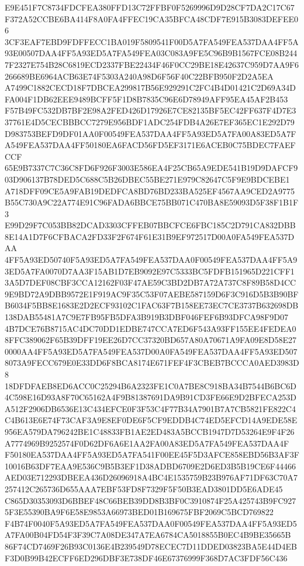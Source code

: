 \documentclass[UTF8,fontset=fandol,zihao=-4,a4paper]{ctexart}
\begin{document}
{{E9E451F7C8734FDCFEA380FFD13C72FFBF0F5269996D9D28CF7DA2C17C67F372A52CCBE6BA414F8A0FA4FFEC19CA35BFCA48CDF7E915B3083DEFEE06
3CF3EAF7EBD9FDFFECC1BA019F5809541F00D5A7FA549FEA537DAA4FF5A93E00507DAA4FF5A93ED5A7FA549FEA03C083A9FE5C96B9B1567FCE08B244
7F2327E754B28C6819ECD2337FBE22434F46F0CC29BE18E42637C959D7AA9F6266689BE6964ACB63E74F5303A240A98D6F56F40C22BFB950F2D2A5EA
A7499C1882CECD18F7DBCEA299817B56E929291C2FC4B4D01421C2D69A34DFA004F1DB62EEE9489BCFF5F1D8B7835C96E6D78949AFF95EA45AF2B453
F57B49FC532DB7BF2E98A2FED426D17926E7CE82135BF5EC42FF637F4D7E337761E4D5CECBBBCC7279E956BDF1ADC254FDB4A26E7EF365EC1E292D79
D983753BEFD9DF01AA0F00549FEA537DAA4FF5A93ED5A7FA00A83ED5A7FA549FEA537DAA4FF50180EA6FACD56FD5EF3171E6ACEB0C75BDEC7FAEFCCF
65E9B7337C7C36C8FD6F926F3003E586EA4F25CB65A9EDE541B19D9DAFCF903D906137B78DED5C688C5B26DBEC55BE271E979C82647C5F9E9BDCEBE1
A718DFF09CE5A9FAB19DEDFCA8BD76BD233BA525EF4567AA9CED2A9775B55C730A9C22A774E91C96FADA6BBCE75BB071C470BA8E59093D5F38F1B1F3
E99D29F7C053BB82DCAD3303CFFEB07BBCFCE6FBC185C2D791CA832DBB8E14A1D7F6CFBACA2FD33F2F674F61E31B9EF972517D00A0FA549FEA537DAA
4FF5A93ED50740F5A93ED5A7FA549FEA537DAA0F00549FEA537DAA4FF5A93ED5A7FA0070D7AA3F15AB1D7EB9092E97C5333BC5FDFB151965D221CFF1
3A5D7DEF08CBF3CCA12162F03F47AE59C3BD2DB7A72A737C8F89B58D4CC9E9BD72A9DBB9572E1F919AC9F35C53F07AEBE587159D6F3C916D5B3B90BF
B6034F5BB8E1683E2D2ECF93102C1FAC63F7B158EE73EC7CE3737B632698DB138DAB55481A7C9E7FB95FB5DFA3B919B3DBF046FEF6B93DFCA98F9D07
4B7DCE76B8715AC4DC70DD1EDBE747CCA7ED6F543A93FF155EE4FEDEA08FFC389062F65B39DFF19EE26D7CC37320BD657A80A70671A9FA09E8D58E27
0000AA4FF5A93ED5A7FA549FEA537D00A0FA549FEA537DAA4FF5A93ED5078073A9FECC679E0E33DD6F8BCA8174E671FEF4F3CBEB7BCCCA0AED3983D8
18DFDFAEB8ED6ACC0C25294B6A2323FE1C0A7BE8C918BA34B7544B6BC6D4C598E16D93A8F70C65162A4F9B81387691DA9B91CD3FE66E9D2BFECA253D
A512F2906DB6536E13C434EFCE0F3F53C4F77B34A7901B7A7CB5821FE822C4C4B613E6E74F73CAF3A9E8EF0DE6F5CF9EDDB4C74ED5EFCD14A9EDE58E
956EA579DA796242BE1C48833FB1AE2ED483A5BCCB1947D7D53264E9F4F26A7774969B9252574F0D62DF6A6E1AA2FA00A83ED5A7FA549FEA537DAA4F
F50180EA537DAA4FF5A93ED5A7FA541F00EE45F5D3AFCE858EBD56B3AF3F10016B63DF7EAA9E536C9B5B3EF1D38ADBD6709E2D6ED3B5B19CE6F44466
AED03E712293DBEEA436D26096918A4BC4E1535759B23B976AF71DF63C70A7257412C265736D655AAA7EBF53FD8F7329F5F50B3EAD3801DD5E6ADE45
C865D30353093D6BBEF48C66BEB39DD8B3BF0C3910874F25A425743B9FC9275F3E55390BA9F6E58E9853A66973BED01B169675FBF2069C5BCD769822
F4B74F0040F5A93ED5A7FA549FEA537DAA0F00549FEA537DAA4FF5A93ED5A7FA00B04FD54F3F39C7A08DE347A7EA6784CA5018855B0EC4B9BE35665B
86F74CD7469F26B93C0136E4B239549D78ECEC7D11DDED03823BA5E44D4EBF3D0B99B42ECFF6ED296DBF3E738DF46E67376999F368D7AC3FDF56C436
}}
\end{document}
